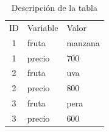 \documentclass[11pt,]{article}
\begin{document}
\clearpage

\begin{table}[]
\centering
\caption{Descripción de la tabla}
\label{etiqueta_tabla}
\begin{tabular}{cll}
ID & Variable & Valor   \\
1  & fruta    & manzana \\
1  & precio   & 700     \\
2  & fruta    & uva     \\
2  & precio   & 800     \\
3  & fruta    & pera    \\
3  & precio   & 600    
\end{tabular}
\end{table}




\end{document}
